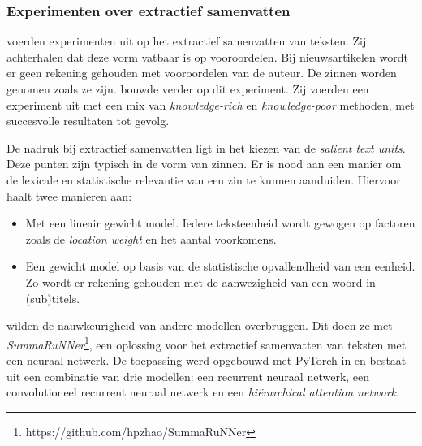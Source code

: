 \subsubsection{Experimenten over extractief samenvatten}


\textcite{McKeown1999} voerden experimenten uit op het extractief samenvatten van teksten. Zij achterhalen dat deze vorm vatbaar is op vooroordelen. Bij nieuwsartikelen wordt er geen rekening gehouden met vooroordelen van de auteur. De zinnen worden genomen zoals ze zijn. \textcite{Hahn2000} bouwde verder op dit experiment. Zij voerden een experiment uit met een mix van \textit{knowledge-rich} en \textit{knowledge-poor} methoden, met succesvolle resultaten tot gevolg.

De nadruk bij extractief samenvatten ligt in het kiezen van de \textit{salient text units}. Deze punten zijn typisch in de vorm van zinnen. Er is nood aan een manier om de lexicale en statistische relevantie van een zin te kunnen aanduiden. Hiervoor haalt \textcite{Hahn2000} twee manieren aan:

\begin{itemize}
	\item Met een lineair gewicht model. Iedere teksteenheid wordt gewogen op factoren zoals de \textit{location weight} en het aantal voorkomens.
	\item Een gewicht model op basis van de statistische opvallendheid van een eenheid. Zo wordt er rekening gehouden met de aanwezigheid van een woord in (sub)titels.
\end{itemize}


\textcite{Nallapati2017} wilden de nauwkeurigheid van andere modellen overbruggen. Dit doen ze met \textit{SummaRuNNer}\footnote{https://github.com/hpzhao/SummaRuNNer}, een oplossing voor het extractief samenvatten van teksten met een neuraal netwerk. De toepassing werd opgebouwd met PyTorch in  en bestaat uit een combinatie van drie modellen: een recurrent neuraal netwerk, een convolutioneel recurrent neuraal netwerk en een \textit{hiërarchical attention network}.

